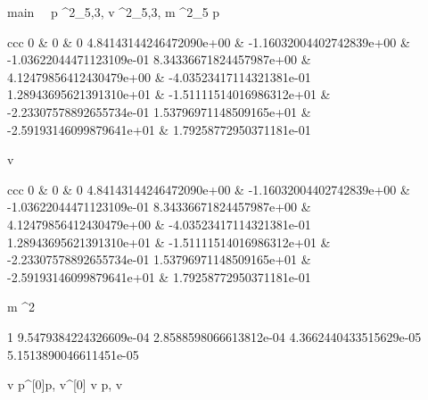 \documentclass[12pt,a4paper]{book}
\begin{document}
\begin{eqcode}{main}{\ }{\ }{}
    p \in {}^2_{5,3},
    v \in {}^2_{5,3},
    m \in {}^2_{5} \lend
    p \gets \begin{tmatrix}{ccc}
            0 & 0 & 0 \lend
            4.84143144246472090e+00 & -1.16032004402742839e+00 &
            -1.03622044471123109e-01 \lend
            8.34336671824457987e+00 & 4.12479856412430479e+00 &
            -4.03523417114321381e-01 \lend
            1.28943695621391310e+01 & -1.51111514016986312e+01 &
            -2.23307578892655734e-01 \lend
            1.53796971148509165e+01 & -2.59193146099879641e+01 &
            1.79258772950371181e-01 \lend 
        \end{tmatrix} \lend
    v  \cdot
        \begin{tmatrix}{ccc}
            0 & 0 & 0 \lend
            4.84143144246472090e+00 & -1.16032004402742839e+00 &
            -1.03622044471123109e-01 \lend
            8.34336671824457987e+00 & 4.12479856412430479e+00 &
            -4.03523417114321381e-01 \lend
            1.28943695621391310e+01 & -1.51111514016986312e+01 &
            -2.23307578892655734e-01 \lend
            1.53796971148509165e+01 & -2.59193146099879641e+01 &
            1.79258772950371181e-01 \lend 
        \end{tmatrix} \lend
    m  \cdot \pi^2 \cdot 
        \begin{tmatrix}
            1 \lend
            9.5479384224326609e-04 \lend
            2.8588598066613812e-04 \lend
            4.3662440433515629e-05 \lend
            5.1513890046611451e-05 \lend
        \end{tmatrix} \lend
    v \gets {} \lend
    p^{[0]}\gets p, v^{[0]} \gets v \lend
    p, v \gets {} \lend
     \lend
\end{eqcode}
\end{document}
